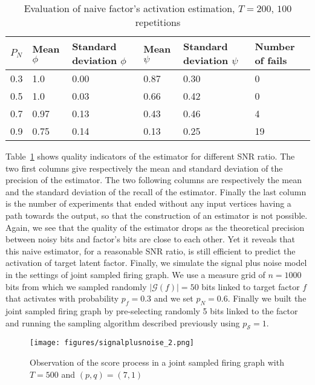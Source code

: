 \documentclass[a4paper, 11pt]{article}
\begin{document}
\begin{table}[H]
\begin{tabular}{|l|l|l|l|l|l|}
\hline
$P_N$ & Mean $\phi$ & Standard deviation $\phi$ & Mean $\psi$ & Standard deviation $\psi$ & Number of fails \\ \hline
0.3   & 1.0         & 0.00                       & 0.87         & 0.30                      & 0               \\ \hline
0.5   & 1.0         & 0.03                      & 0.66         & 0.42                      & 0               \\ \hline
0.7   & 0.97        & 0.13                      & 0.43        & 0.46                      & 4               \\ \hline
0.9   & 0.75        & 0.14                      & 0.13        & 0.25                      & 19              \\ \hline
\end{tabular}
\caption{Evaluation of naive factor's activation estimation, $T=200$, $100$ repetitions}
\label{tab:sim_spn_1}
\end{table}

Table~\ref{tab:sim_spn_1} shows quality indicators of the estimator for different SNR ratio. The two first columns give respectively the mean and standard deviation of the precision of the estimator. The two following columns are respectively the mean and the standard deviation of the recall of the estimator. Finally the last column is the number of experiments that ended without any input vertices having a path towards the output, so that the construction of an estimator is not possible. Again, we see that the quality of the estimator drops as the theoretical precision between noisy bits and factor's bits are close to each other. Yet it reveals that this naive estimator, for a reasonable SNR ratio, is still efficient to predict the activation of target latent factor. Finally, we simulate the signal plus noise model in the settings of joint sampled firing graph. We use a measure grid of $n=1000$ bits from which we sampled randomly $\vert \mathcal{G}(f) \vert = 50$ bits linked to target factor $f$ that activates with probability $p_f = 0.3$ and we set $p_N=0.6$. Finally we built the joint sampled firing graph by pre-selecting randomly 5 bits linked to the factor and running the sampling algorithm described previously using $p_{\mathcal{S}} = 1$.

\begin{figure}[H]
\centering
\texttt{[image: figures/signalplusnoise\_2.png]}
\caption{Observation of the score process in a joint sampled firing graph with $T=500$ and $(p, q) = (7, 1)$}
\label{fig:sim_spn_2}
\end{figure}
\end{document}
